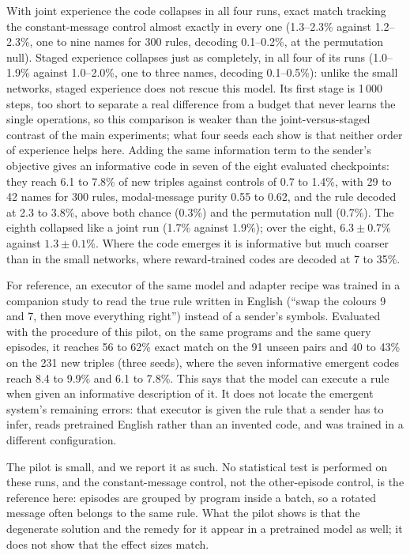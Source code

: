 \documentclass[11pt]{article}
\begin{document}
With joint experience the code collapses in all four runs, exact match tracking the constant-message control almost
exactly in every one (1.3--2.3\% against 1.2--2.3\%, one to nine names for 300 rules, decoding 0.1--0.2\%, at the
permutation null). Staged experience collapses just as completely, in all four of its runs (1.0--1.9\% against
1.0--2.0\%, one to three names, decoding 0.1--0.5\%): unlike the small networks, staged experience does not rescue
this model. Its first stage is 1\,000 steps, too short to separate a real difference from a budget that never learns
the single operations, so this comparison is weaker than the joint-versus-staged contrast of the main experiments;
what four seeds each show is that neither order of experience helps here. Adding the same information term to the
sender's objective gives an informative code in seven of the eight evaluated checkpoints: they reach 6.1 to 7.8\% of
new triples against controls of 0.7
to 1.4\%, with 29 to 42 names for 300 rules, modal-message purity 0.55 to 0.62, and the rule decoded at 2.3 to
3.8\%, above both chance (0.3\%) and the permutation null (0.7\%). The eighth collapsed like a joint run (1.7\%
against 1.9\%); over the eight, $6.3\pm0.7$\% against $1.3\pm0.1$\%. Where the code emerges it is informative but
much coarser than in the small networks, where reward-trained codes are decoded at 7 to 35\%.

For reference, an executor of the same model and adapter recipe was trained in a companion study to read the true
rule written in English (``swap the colours 9 and 7, then move everything right'') instead of a sender's symbols.
Evaluated with the procedure of this pilot, on the same programs and the same query episodes, it reaches 56 to
62\% exact match on the 91 unseen pairs and 40 to 43\% on the 231 new triples (three seeds), where the seven
informative emergent codes reach 8.4 to 9.9\% and 6.1 to 7.8\%.
This says that the model can execute a rule when given an informative description of it. It does not locate the
emergent system's remaining errors: that executor is given the rule that a sender has to infer, reads pretrained
English rather than an invented code, and was trained in a different configuration.

The pilot is small, and we report it as such. No statistical test is performed on these runs, and the
constant-message control, not the other-episode control, is the reference here: episodes are grouped by program
inside a batch, so a rotated message often belongs to the same rule. What the pilot shows is that the degenerate
solution and the remedy for it appear in a pretrained model as well; it does not show that the effect sizes match.
\end{document}
